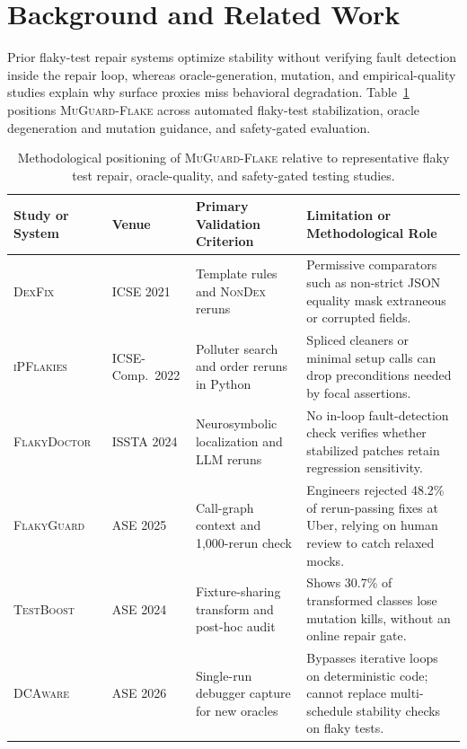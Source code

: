 \section{Background and Related Work}
\label{sec:related}

Prior flaky-test repair systems optimize stability without verifying fault detection inside the repair loop, whereas oracle-generation, mutation, and empirical-quality studies explain why surface proxies miss behavioral degradation. Table~\ref{tab:related_boundary} positions \textsc{MuGuard-Flake} across automated flaky-test stabilization, oracle degeneration and mutation guidance, and safety-gated evaluation.

\begin{table}[t]
\centering
\caption{Methodological positioning of \textsc{MuGuard-Flake} relative to representative flaky test repair, oracle-quality, and safety-gated testing studies.}
\label{tab:related_boundary}
\scriptsize
\setlength{\tabcolsep}{3.8pt}
\begin{tabular}{>{\raggedright\arraybackslash}p{2.7cm}>{\raggedright\arraybackslash}p{1.8cm}>{\raggedright\arraybackslash}p{4.0cm}>{\raggedright\arraybackslash}p{5.6cm}}
\toprule
Study or System & Venue & Primary Validation Criterion & Limitation or Methodological Role \\
\midrule
\textsc{DexFix}~\cite{zhang2021dexfix} & ICSE 2021 & Template rules and \textsc{NonDex} reruns & Permissive comparators such as non-strict JSON equality mask extraneous or corrupted fields. \\
\textsc{iPFlakies}~\cite{wang2022ipflakies} & ICSE-Comp.\ 2022 & Polluter search and order reruns in Python & Spliced cleaners or minimal setup calls can drop preconditions needed by focal assertions. \\
\textsc{FlakyDoctor}~\cite{chen2024flakydoctor} & ISSTA 2024 & Neurosymbolic localization and LLM reruns & No in-loop fault-detection check verifies whether stabilized patches retain regression sensitivity. \\
\textsc{FlakyGuard}~\cite{li2025flakyguard} & ASE 2025 & Call-graph context and 1,000-rerun check & Engineers rejected 48.2\% of rerun-passing fixes at Uber, relying on human review to catch relaxed mocks. \\
\textsc{TestBoost}~\cite{li2024testboost} & ASE 2024 & Fixture-sharing transform and post-hoc audit & Shows 30.7\% of transformed classes lose mutation kills, without an online repair gate. \\
\textsc{DCAware}~\cite{li2026dcaware} & ASE 2026 & Single-run debugger capture for new oracles & Bypasses iterative loops on deterministic code; cannot replace multi-schedule stability checks on flaky tests. \\

\end{tabular}
\end{table}
